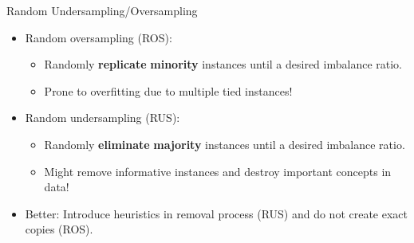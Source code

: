 \documentclass[11pt,compress,t,notes=noshow, xcolor=table]{beamer}
\begin{document}
\begin{frame}{Random Undersampling/Oversampling}

    \begin{itemize}
        \item Random oversampling (ROS):
        \begin{itemize}
            \item Randomly \textbf{replicate} \textbf{minority} instances until a desired imbalance ratio.
            \item Prone to overfitting due to multiple tied instances!
        \end{itemize}

        \item Random undersampling (RUS):
        \begin{itemize}
            \item Randomly \textbf{eliminate} \textbf{majority} instances until a desired imbalance ratio.
            \item Might remove informative instances and destroy important concepts in data!
        \end{itemize}

        \item Better: Introduce heuristics in removal process (RUS) and do not create exact copies (ROS).
    
        \end{itemize}	

\end{frame}
	
\end{document}

